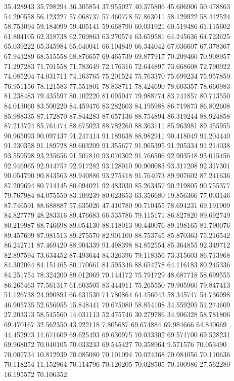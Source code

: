 35.428943
35.798294
36.305854
37.955027
40.375806
45.606906
50.478863
54.290558
56.123227
57.068737
57.460778
57.863011
58.129922
58.412524
58.753094
59.184099
59.405141
59.668790
60.031921
60.519486
61.115602
61.804105
62.318738
62.769863
63.270574
63.659581
64.245636
64.723625
65.039222
65.345984
65.640041
66.104849
66.344042
67.036607
67.378367
67.943289
68.515558
68.876657
69.465739
69.877917
70.209460
70.908957
71.297283
71.701558
71.783649
72.176316
72.644897
73.668608
72.790922
74.085204
74.031711
74.163765
75.201524
75.763370
75.699234
75.957859
76.951156
78.121583
77.551801
78.838711
78.424690
78.603357
78.666983
81.238483
79.435597
80.102220
81.095047
79.988774
83.741857
80.713550
84.013060
83.500220
84.459476
83.282603
84.195988
86.719873
86.802608
85.988335
87.172870
87.844283
87.657136
88.754894
86.319244
88.924858
87.213724
85.761474
88.675023
88.782260
88.363111
85.963981
89.455955
90.965093
90.097137
91.247414
91.189638
88.982911
90.418049
91.204440
91.230358
91.189728
89.603209
91.355677
91.965395
91.205334
91.214038
93.559598
93.235656
91.507810
93.070302
91.766506
92.903548
93.015456
92.946965
92.944757
92.917282
93.128010
90.900083
93.317208
92.317301
90.054790
90.843563
89.940886
93.275418
91.764073
89.907602
87.241636
87.209694
80.714145
80.094021
92.483030
85.263457
90.219805
90.755377
79.767984
84.075550
83.109239
80.023653
63.356680
19.856366
77.003146
87.746591
88.688887
57.635026
47.410780
90.710455
78.694231
69.191909
84.827779
48.283316
89.476683
66.535786
79.115171
86.827820
89.692749
80.219987
88.746698
89.054130
88.118013
90.440076
89.198165
81.790076
89.457699
87.981513
89.275570
82.901100
88.753745
85.870363
75.216542
86.242711
87.469420
88.904339
91.498398
84.852554
85.364855
92.349712
82.897594
73.634452
87.493644
84.326396
79.118356
73.315603
86.713968
84.302064
84.151465
80.170661
81.595346
88.654278
64.116183
80.245336
84.251754
78.324200
89.012069
70.144172
75.791729
48.687718
58.699555
86.265463
77.561317
61.603505
83.444911
75.265550
79.905960
79.847413
51.126738
24.990891
66.631530
71.780864
64.456043
58.345747
54.736998
46.905735
52.656055
15.848441
70.675080
58.854108
34.559205
51.274609
27.203313
58.545560
14.031113
52.475746
30.279786
34.906328
58.781806
69.470167
32.562350
43.922118
7.805687
69.674884
69.984666
64.840669
44.452973
11.671609
69.625493
69.630975
70.033302
69.571700
69.528231
69.968072
70.040105
70.033233
69.545427
70.358964
9.571576
70.053490
70.007734
10.812939
70.085080
70.101094
70.024368
70.084056
70.110636
70.118254
11.152964
70.114796
70.120205
70.028505
70.100986
27.562280
16.195572
70.106352
